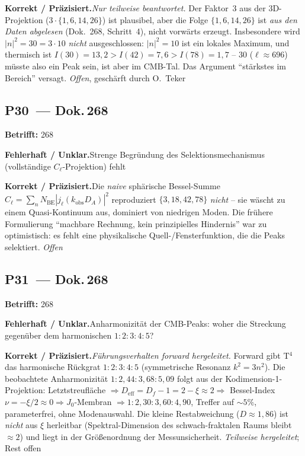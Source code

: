 \smallskip\noindent\textbf{Korrekt / Präzisiert.}\quad \emph{Nur teilweise beantwortet.} Der Faktor~3 aus der 3D-Projektion ($3\cdot\{1,6,14,26\}$) ist plausibel, aber die Folge $\{1,6,14,26\}$ ist \emph{aus den Daten abgelesen} (Dok.~268, Schritt~4), nicht vorwärts erzeugt. Insbesondere wird $|n|^2=30=3\cdot10$ \emph{nicht} ausgeschlossen: $|n|^2=10$ ist ein lokales Maximum, und thermisch ist $I(30)=13{,}2 > I(42)=7{,}6 > I(78)=1{,}7$ -- $30$ ($\ell\approx696$) müsste also ein Peak sein, ist aber im CMB-Tal. Das Argument ``stärkstes im Bereich'' versagt. \emph{Offen}, geschärft durch O.~Teker


\medskip


\subsection*{P30~--- Dok.\,268}

\noindent\textbf{Betrifft:} 268


\smallskip\noindent\textbf{Fehlerhaft / Unklar.}\quad Strenge Begründung des Selektionsmechanismus (vollständige $C_\ell$-Projektion) fehlt


\smallskip\noindent\textbf{Korrekt / Präzisiert.}\quad Die \emph{naive} sphärische Bessel-Summe $C_\ell=\sum_n N_\mathrm{BE}|j_\ell(k_\mathrm{obs}D_A)|^2$ reproduziert $\{3,18,42,78\}$ \emph{nicht} -- sie wäscht zu einem Quasi-Kontinuum aus, dominiert von niedrigen Moden. Die frühere Formulierung ``machbare Rechnung, kein prinzipielles Hindernis'' war zu optimistisch: es fehlt eine physikalische Quell-/Fensterfunktion, die die Peaks selektiert. \emph{Offen}


\medskip


\subsection*{P31~--- Dok.\,268}

\noindent\textbf{Betrifft:} 268


\smallskip\noindent\textbf{Fehlerhaft / Unklar.}\quad Anharmonizität der CMB-Peaks: woher die Streckung gegenüber dem harmonischen $1:2:3:4:5$?


\smallskip\noindent\textbf{Korrekt / Präzisiert.}\quad \emph{Führungsverhalten forward hergeleitet.} Forward gibt T$^4$ das harmonische Rückgrat $1:2:3:4:5$ (symmetrische Resonanz $k^2=3n^2$). Die beobachtete Anharmonizität $1:2{,}44:3{,}68:5{,}09$ folgt aus der Kodimension-1-Projektion: Letztstreufläche $\Rightarrow D_\mathrm{eff}=D_f-1=2-\xi\approx2 \Rightarrow$ Bessel-Index $\nu=-\xi/2\approx0 \Rightarrow J_0$-Membran $\Rightarrow 1:2{,}30:3{,}60:4{,}90$, Treffer auf $\sim5\%$, parameterfrei, ohne Modenauswahl. Die kleine Restabweichung ($D\approx1{,}86$) ist \emph{nicht} aus $\xi$ herleitbar (Spektral-Dimension des schwach-fraktalen Raums bleibt $\approx2$) und liegt in der Größenordnung der Messunsicherheit. \emph{Teilweise hergeleitet}; Rest offen


